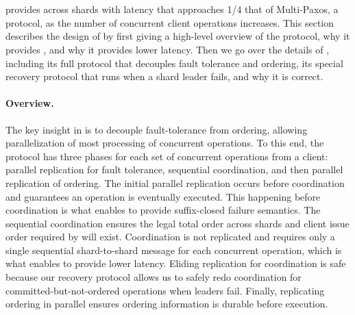 \section{\sys{}}
\label{sec:design}

\sys{} provides \mdl{} across shards with latency that approaches 1/4 that of Multi-Paxos, a \sdl{} protocol, as the number of concurrent client operations increases.
This section describes the design of \sys{} by
first giving a high-level overview of the protocol, why it provides \mdl{}, and why it provides lower latency.
Then we go over the details of \sys{}, including
its full protocol that decouples fault tolerance and ordering,
its special recovery protocol that runs when a shard leader fails,
and why it is correct.


\paragraph{\sys{} Overview.}
The key insight in \sys{} is to decouple fault-tolerance from ordering, allowing
parallelization of most processing of concurrent operations. To this end, the
\sys{} protocol has three phases for each set of concurrent operations from a
client: parallel replication for fault tolerance, sequential coordination, and
then parallel replication of ordering. The initial parallel replication occurs
before coordination and guarantees an operation is eventually executed.
This happening before coordination is what enables \sys{} to provide
suffix-closed failure semantics.  The sequential coordination ensures the legal
total order across shards and client issue order required by \mdl{} will exist.
Coordination is not replicated and requires only a single sequential
shard-to-shard message for each concurrent operation, which is what enables
\sys{} to provide lower latency.  Eliding replication for coordination is safe
because our recovery protocol allows us to safely redo coordination for
committed-but-not-ordered operations when leaders fail.  Finally,
replicating ordering in parallel ensures ordering information is durable before
execution.


